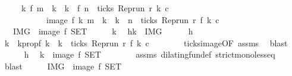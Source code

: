 \begin{isabellebody}
\ \ \ \ \ {\isacartoucheopen}{\isacharbraceleft}k{\isachardot}\ f\ m\ {\isasymle}\ k\ {\isasymand}\ k\ {\isasymle}\ f\ n\ {\isasymand}\ ticks\ {\isacharparenleft}{\isacharparenleft}Rep{\isacharunderscore}run\ r{\isacharparenright}\ k\ c{\isacharparenright}{\isacharbraceright}\isanewline
\ \ \ \ \ \ \ \ \ \ {\isacharequal}\ image\ f\ {\isacharbraceleft}k{\isachardot}\ m\ {\isasymle}\ k\ {\isasymand}\ k\ {\isasymle}\ n\ {\isasymand}\ ticks\ {\isacharparenleft}{\isacharparenleft}Rep{\isacharunderscore}run\ r{\isacharparenright}\ {\isacharparenleft}f\ k{\isacharparenright}\ c{\isacharparenright}{\isacharbraceright}{\isacartoucheclose}\isanewline
\ \ {\isacharparenleft}\ {\isacartoucheopen}{\isacharquery}IMG\ {\isacharequal}\ image\ f\ {\isacharquery}SET{\isacartoucheclose}{\isacharparenright}\isanewline
%
\isadelimproof
%
\endisadelimproof
%
\isatagproof
{}\isamarkupfalse%
\isanewline
\ \ \isacommand{{\isacharbraceleft}}\isamarkupfalse%
\ \isamarkupfalse%
\ k\ \isamarkupfalse%
\ h{\isacharcolon}{\isacartoucheopen}k\ {\isasymin}\ {\isacharquery}IMG{\isacartoucheclose}\isanewline
\ \ \ \ \isamarkupfalse%
\ h\ \isamarkupfalse%
\ k\ \ k{}prop{\isacharcolon}{\isacartoucheopen}f\ k\ {\isacharequal}\ k\ {\isasymand}\ ticks\ {\isacharparenleft}{\isacharparenleft}Rep{\isacharunderscore}run\ r{\isacharparenright}\ {\isacharparenleft}f\ k\ c{\isacharparenright}{\isacartoucheclose}\isanewline
\ \ \ \ \ \ \isamarkupfalse%
\ ticks{\isacharunderscore}image{\isacharbrackleft}OF\ assms{\isacharbrackright}\ \isamarkupfalse%
\ blast\isanewline
\ \ \ \ \isamarkupfalse%
\ h\ \isamarkupfalse%
\ {\isacartoucheopen}k\ {\isasymin}\ image\ f\ {\isacharquery}SET{\isacartoucheclose}\isanewline
\ \ \ \ \ \ \isamarkupfalse%
\ assms\ dilating{\isacharunderscore}fun{\isacharunderscore}def\ strict{\isacharunderscore}mono{\isacharunderscore}less{\isacharunderscore}eq\ \isamarkupfalse%
\ blast\isanewline
\ \ \isacommand{{\isacharbraceright}}\isamarkupfalse%
\ \isamarkupfalse%
\ {\isacartoucheopen}{\isacharquery}IMG\ {\isasymsubseteq}\ image\ f\ {\isacharquery}SET{\isacartoucheclose}\ \isacommand{{\isachardot}{\isachardot}}\isamarkupfalse%
\isanewline
{}\isamarkupfalse%
\isanewline
\ \ \isacommand{{\isacharbraceleft}}\isamarkupfalse%

\end{isabellebody}
